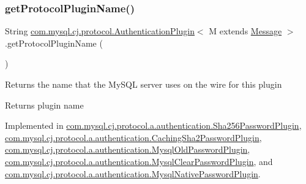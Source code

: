 \mbox{\label{interfacecom_1_1mysql_1_1cj_1_1protocol_1_1_authentication_plugin_ab428486b799598c36f4506c95ff5b94b}} 
\subsubsection{\texorpdfstring{get\+Protocol\+Plugin\+Name()}{getProtocolPluginName()}}
{\footnotesize\ttfamily String \mbox{\hyperlink{interfacecom_1_1mysql_1_1cj_1_1protocol_1_1_authentication_plugin}{com.\+mysql.\+cj.\+protocol.\+Authentication\+Plugin}}$<$ M extends \mbox{\hyperlink{interfacecom_1_1mysql_1_1cj_1_1protocol_1_1_message}{Message}} $>$.get\+Protocol\+Plugin\+Name (\begin{DoxyParamCaption}{ }\end{DoxyParamCaption})}

Returns the name that the My\+S\+QL server uses on the wire for this plugin

\begin{DoxyReturn}{Returns}
plugin name 
\end{DoxyReturn}


Implemented in \mbox{\hyperlink{classcom_1_1mysql_1_1cj_1_1protocol_1_1a_1_1authentication_1_1_sha256_password_plugin_a37166ed37c83a82c995bee4f1edb43eb}{com.\+mysql.\+cj.\+protocol.\+a.\+authentication.\+Sha256\+Password\+Plugin}}, \mbox{\hyperlink{classcom_1_1mysql_1_1cj_1_1protocol_1_1a_1_1authentication_1_1_caching_sha2_password_plugin_adefb39fe1f5c9624bf96076a6be9ffc0}{com.\+mysql.\+cj.\+protocol.\+a.\+authentication.\+Caching\+Sha2\+Password\+Plugin}}, \mbox{\hyperlink{classcom_1_1mysql_1_1cj_1_1protocol_1_1a_1_1authentication_1_1_mysql_old_password_plugin_aa71d4dbe9fa1ed67725f89b14fa06e72}{com.\+mysql.\+cj.\+protocol.\+a.\+authentication.\+Mysql\+Old\+Password\+Plugin}}, \mbox{\hyperlink{classcom_1_1mysql_1_1cj_1_1protocol_1_1a_1_1authentication_1_1_mysql_clear_password_plugin_aa462c22d7def92918450800cdeb62893}{com.\+mysql.\+cj.\+protocol.\+a.\+authentication.\+Mysql\+Clear\+Password\+Plugin}}, and \mbox{\hyperlink{classcom_1_1mysql_1_1cj_1_1protocol_1_1a_1_1authentication_1_1_mysql_native_password_plugin_ad008264c483755da1987a7a9a6401039}{com.\+mysql.\+cj.\+protocol.\+a.\+authentication.\+Mysql\+Native\+Password\+Plugin}}.

